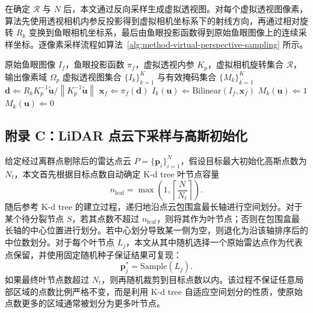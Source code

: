 {    在确定 \(\mathcal{R}\) 与 \(N\) 后，本文通过反向采样生成虚拟透视图。对每个虚拟透视图像素，算法先使用透视相机内参反投影得到虚拟相机坐标系下的射线方向，再通过相对旋转 \(R_k\) 变换到鱼眼相机坐标系，最后由鱼眼投影函数得到原始鱼眼图像上的连续采样坐标。逐像素采样流程如算法~\ref{alg:method-virtual-perspective-sampling} 所示。

    \begin{algorithm}[!htbp]
        \caption{鱼眼图像到虚拟透视图的反向采样}
        \label{alg:method-virtual-perspective-sampling}
        \begin{algorithmic}[1]
            \REQUIRE 原始鱼眼图像 \(I_f\)，鱼眼投影函数 \(\pi_f\)，虚拟透视内参 \(K_p\)，虚拟相机旋转集合 \(\mathcal{R}\)，输出像素域 \(\Omega_p\)
            \ENSURE 虚拟透视图集合 \(\{I_k\}_{k=1}^{K}\) 与有效掩码集合 \(\{M_k\}_{k=1}^{K}\)
                    \STATE \(\mathbf{d}\Leftarrow R_k K_p^{-1}\tilde{\mathbf{u}} / \left\|K_p^{-1}\tilde{\mathbf{u}}\right\|\)
                    \STATE \(\mathbf{x}_f\Leftarrow \pi_f(\mathbf{d})\)
                        \STATE \(I_k(\mathbf{u})\Leftarrow \mathrm{Bilinear}(I_f,\mathbf{x}_f)\)
                        \STATE \(M_k(\mathbf{u})\Leftarrow 1\)
                    \ELSE
                        \STATE \(M_k(\mathbf{u})\Leftarrow 0\)
                    \ENDIF
                \ENDFOR
            \ENDFOR
        \end{algorithmic}
    \end{algorithm}

    \FloatBarrier
    \subsection*{附录 C：LiDAR 点云下采样与高斯初始化}
    \label{app:lidar-init}

    给定经过离群点剔除后的雷达点云 \(P=\{\mathbf{p}_i\}_{i=1}^{N}\)，假设目标最大初始化高斯点数为 \(N_t\)，本文首先根据目标点数自动确定 K-d tree 叶节点容量
    \begin{equation}
        \label{equ:method-kdtree-nmin}
        n_{\mathrm{leaf}}
        =
        \max\left(1,\left\lceil \frac{N}{N_t}\right\rceil\right).
    \end{equation}
    随后参考 K-d tree 的建立过程，递归地沿点云包围盒最长轴进行空间划分。对于某个待分裂节点 \(S\)，若其点数不超过 \(n_{\mathrm{leaf}}\)，则将其作为叶节点；否则在包围盒最长轴的中心位置进行划分。若中心划分导致某一侧为空，则退化为沿该轴排序后的中位数划分。对于每个叶节点 \(L_j\)，本文从其中随机选择一个原始雷达点作为代表点保留，并使用固定随机种子保证结果可复现：
    \begin{equation}
        \label{equ:method-kdtree-centroid}
        \mathbf{p}_j^\ast
        =
        \mathrm{Sample}(L_j).
    \end{equation}
    如果最终叶节点数超过 \(N_t\)，则再随机裁剪到目标点数以内。该过程不保证任意局部区域的点数比例严格不变，而是利用 K-d tree 自适应空间划分的性质，使原始点数更多的区域通常被划分为更多叶节点。

}
